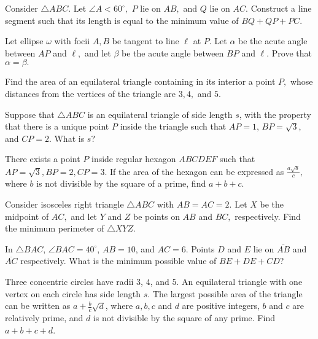\documentclass[mast]{lucky}
\begin{document}
    \begin{prob}[]{4}
    Consider $\triangle ABC.$ Let $\angle A<60^{\circ},$ $P$ lie on $AB,$ and $Q$ lie on $AC.$ Construct a line segment such that its length is equal to the minimum value of $BQ+QP+PC.$
    \end{prob}

    \begin{prob}[]{6}
Let ellipse $\omega$ with focii $A,B$ be tangent to line $\ell$ at $P.$ Let $\alpha$ be the acute angle between $AP$ and $\ell,$ and let $\beta$ be the acute angle between $BP$ and $\ell.$ Prove that $\alpha=\beta.$
\end{prob}
    
    \begin{prob}[]{6}
Find the area of an equilateral triangle containing in its interior a point $P,$ whose distances from the vertices of the triangle are $3,4,$ and $5.$
\end{prob}  
    
    \begin{prob}[AMC 12A 2020/24]{6}
Suppose that $\triangle ABC$ is an equilateral triangle of side length $s$, with the property that there is a unique point $P$ inside the triangle such that $AP = 1$, $BP = \sqrt{3}$, and $CP = 2$. What is $s?$
\end{prob}
    
    \begin{prob}{6}
 There exists a point $P$ inside regular hexagon $ABCDEF$ such that $AP=\sqrt{3},BP=2,CP=3.$ If the area of the hexagon can be expressed as $\frac{a\sqrt{b}}{c},$ where $b$ is not divisible by the square of a prime, find $a+b+c.$
\end{prob}

    \begin{prob}[China]{6}
Consider isosceles right triangle $\triangle ABC$ with $AB=AC=2.$ Let $X$ be the midpoint of $AC,$ and let $Y$ and $Z$ be points on $AB$ and $BC,$ respectively. Find the minimum perimeter of $\triangle XYZ.$
\end{prob}
    
    \begin{prob}[AMC 12A 2014/20]{6}
In $\triangle BAC$, $\angle BAC=40^\circ$, $AB=10$, and $AC=6$. Points $D$ and $E$ lie on $\overline{AB}$ and $\overline{AC}$ respectively. What is the minimum possible value of $BE+DE+CD$?
\end{prob}
    
    \begin{prob}[AIME I 2012/13]{6}
 Three concentric circles have radii $3$, $4$, and $5$.  An equilateral triangle with one vertex on each circle has side length $s$.  The largest possible area of the triangle can be written as $a+\frac{b}{c}\sqrt{d}$, where $a,b,c$ and $d$ are positive integers, $b$ and $c$ are relatively prime, and $d$ is not divisible by the square of any prime.  Find $a+b+c+d$.
\end{prob}
    
\end{document}
